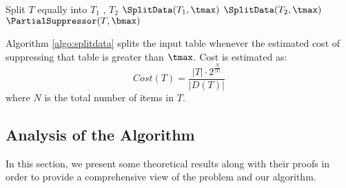 \begin{algorithm}
\caption{$\SplitData(T,\tmax)$} \label{algo:splitdata}
\begin{algorithmic}[1]
        \STATE Split $T$ equally into $T_1$ , $T_2$
        \STATE $\SplitData(T_1,  \tmax)$
        \STATE $\SplitData(T_2, \tmax)$
    \ELSE
        \STATE $\PartialSuppressor(T,  \bmax)$
    \ENDIF
\end{algorithmic}
\end{algorithm}

Algorithm \ref{algo:splitdata}
splits the input table whenever the estimated cost of
suppressing that table is greater than $\tmax$.
Cost is estimated as:
\begin{equation}\label{eq:costfunc}
Cost(T)=\frac{|T|\cdot 2^{\frac{N}{|T|}}}{|D(T)|}
\end{equation}
where $N$ is the total number of items in $T$.

\subsection{Analysis of the Algorithm}
\label{sec:analysis}

%

In this section, we present some theoretical results along with their proofs
in order to provide a comprehensive view of the problem and our algorithm.


